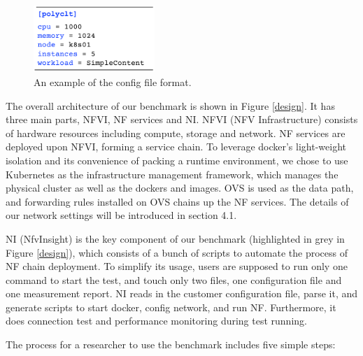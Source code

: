 \begin{figure}[!t]
\centering
\includegraphics[width=1.8in]{fig/config_file.pdf}
\caption{An example of the config file format.}
\label{config}
\end{figure}

The overall architecture of our benchmark is shown in Figure \ref{design}.
It has three main parts, NFVI, NF services and NI.
NFVI (NFV Infrastructure) consists of hardware resources
including compute, storage and network.
NF services are deployed upon NFVI, forming a service chain.
To leverage docker's light-weight isolation
and its convenience of packing a runtime environment,
we chose to use Kubernetes as the infrastructure management framework,
which manages the physical cluster as well as the dockers and images.
OVS is used as the data path,
and forwarding rules installed on OVS chains up the NF services.
The details of our network settings will be introduced in section 4.1.

NI (NfvInsight) is the key component of our benchmark
(highlighted in grey in Figure  \ref{design}),
which consists of a bunch of scripts
to automate the process of NF chain deployment.
To simplify its usage,
users are supposed to run only one command to start the test,
and touch only two files,
one configuration file and one measurement report.
NI reads in the customer configuration file,
parse it, and generate scripts to start docker, config network, and run NF.
Furthermore, it does connection test and performance monitoring during test running.

The process for a researcher to use the benchmark includes five simple steps:

